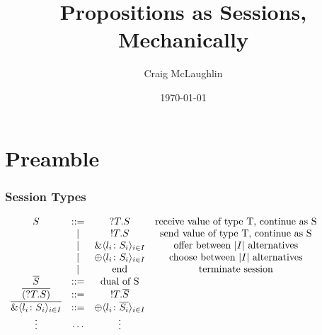 \documentclass{beamer}
\title[Project Presentation]{Propositions as Sessions, Mechanically}
\author{Craig McLaughlin}
\institute{University Of Glasgow}
\date{\today}
\newcommand{\altt}{~|~}
\let\oldframetitle\frametitle
\renewcommand{\frametitle}[1]{
  \oldframetitle{#1}\vspace{-3.5cm}
}
\begin{document}
\begin{frame}
\titlepage
\end{frame}

\section{Preamble}

\begin{comment}
today i am going to talk about a formalisation effort based on an existing
type system whose properties have previously only been studied
informally. first in order to motivate the previous and current work i shall
make two general observations here. one: distributed communication systems are
becoming increasingly prevalent in modern society. two: the correct
functioning of these systems hinges on the protocol between any two
communicating agents to be well-defined and correctly implemented.
\end{comment}

\begin{frame}
\oldframetitle{Session Types}
\begin{math}
  \begin{array}{cccc}
    S & \bnf  & \inpt{T}{S} & \mbox{receive value of type T, continue as S}\\
      & \altt & \outpt{T}{S} & \mbox{send value of type T, continue as S}\\
      & \altt & \Branch{l_i}{S_i}{i\in I} &
                           \mbox{offer between $|I|$ alternatives}\\
      & \altt & \Choice{l_i}{S_i}{i\in I} &
                           \mbox{choose between $|I|$ alternatives}\\
      & \altt & \mbox{\lstinline{end}} & \mbox{terminate session}\\
 \dual{S} & \bnf & \mbox{dual of S}\\
 \dual{(\inpt{T}{S})} & \bnf & \outpt{T}{\dual{S}}\\
 \dual{\Branch{l_i}{S_i}{i\in I}} & \bnf & \Choice{l_i}{\dual{S_i}}{i\in I}\\
            \vdots                & \cdots & \vdots
 \end{array}
\end{math}
\end{frame}

\begin{comment}
one approach to achieve such correctness guarantees is by using binary session
types. [INTRODUCE BINARY SESSION TYPES HERE]. specifying a communication
protocol then involves providing mutual dual types to the communicating
parties. [a simple example with two processes is displayed].
\end{comment}
\end{document}
